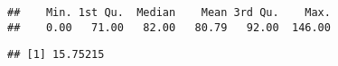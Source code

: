 \documentclass[
]{article}
\newenvironment{Shaded}{\begin{snugshade}}{\end{snugshade}}
\newcommand{\KeywordTok}[1]{\textcolor[rgb]{0.13,0.29,0.53}{\textbf{#1}}}
\newcommand{\NormalTok}[1]{#1}
\newcommand{\OperatorTok}[1]{\textcolor[rgb]{0.81,0.36,0.00}{\textbf{#1}}}
\begin{document}
\begin{verbatim}
##    Min. 1st Qu.  Median    Mean 3rd Qu.    Max. 
##    0.00   71.00   82.00   80.79   92.00  146.00
\end{verbatim}

\begin{Shaded}
\end{Shaded}

\begin{verbatim}
## [1] 15.75215
\end{verbatim}
\end{document}

